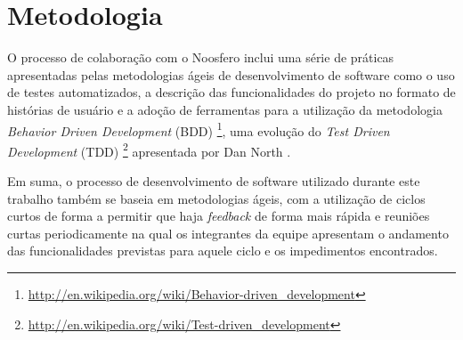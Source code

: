 \section{Metodologia}
\label{sec:metodologia}

O processo de colaboração com o Noosfero inclui uma série de práticas apresentadas
pelas metodologias ágeis de desenvolvimento de software como o uso de testes
automatizados, a descrição das funcionalidades do projeto no formato de
histórias de usuário e a adoção de ferramentas para a utilização da metodologia
\textit{Behavior Driven Development} (BDD)%
\footnote{\url{http://en.wikipedia.org/wiki/Behavior-driven_development}},
uma evolução do \textit{Test Driven Development} (TDD)%
\footnote{\url{http://en.wikipedia.org/wiki/Test-driven_development}}
apresentada por Dan North \cite{north2006}.


Em suma, o processo de desenvolvimento de software utilizado durante este trabalho
também se baseia em metodologias ágeis, com a utilização de ciclos curtos de
forma a permitir que haja \textit{feedback} de forma mais rápida e reuniões
curtas periodicamente na qual os integrantes da equipe apresentam o andamento
das funcionalidades previstas para aquele ciclo e os impedimentos encontrados.
